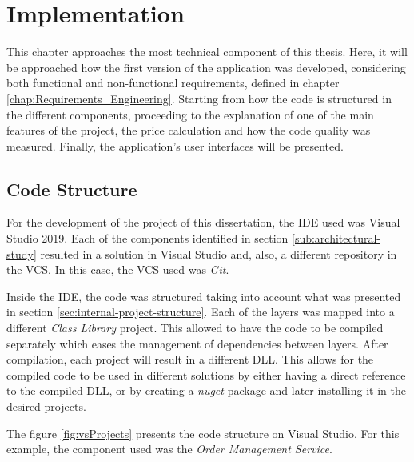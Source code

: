 \chapter{Implementation} %
\label{chap:Implementation}

This chapter approaches the most technical component of this thesis. Here, it will be approached how the first version of the application was developed, considering both functional and non-functional requirements, defined in chapter \ref{chap:Requirements_Engineering}. Starting from how the code is structured in the different components, proceeding to the explanation of one of the main features of the project, the price calculation and how the code quality was measured. Finally, the application's user interfaces will be presented.

\section{Code Structure}
For the development of the project of this dissertation, the \gls{IDE} used was Visual Studio 2019. Each of the components identified in section \ref{sub:architectural-study} resulted in a solution in Visual Studio and, also, a different repository in the \gls{VCS}. In this case, the \gls{VCS} used was \textit{Git}.

\par

Inside the \gls{IDE}, the code was structured taking into account what was presented in section \ref{sec:internal-project-structure}. Each of the layers was mapped into a different \textit{Class Library} project. This allowed to have the code to be compiled separately which eases the management of dependencies between layers. After compilation, each project will result in a different \gls{DLL}. This allows for the compiled code to be used in different solutions by either having a direct reference to the compiled \gls{DLL}, or by creating a \textit{nuget} package and later installing it in the desired projects.
\par

The figure \ref{fig:vsProjects} presents the code structure on Visual Studio. For this example, the component used was the \textit{Order Management Service}.

